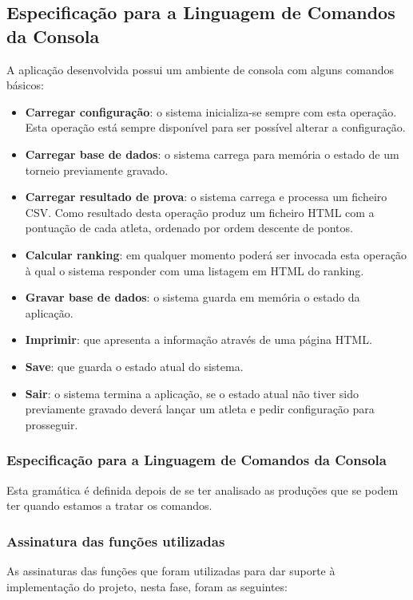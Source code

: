 \documentclass[11pt, a4paper, oneside]{article}
\begin{document}
\subsection{Especificação para a Linguagem de Comandos da Consola}
A aplicação desenvolvida possui um ambiente de consola com alguns comandos básicos:
\begin{itemize}
\item \textbf{Carregar configuração}: o sistema inicializa-se sempre com esta operação. Esta operação está sempre disponível para ser possível alterar a configuração.
\item \textbf{Carregar base de dados}: o sistema carrega para memória o estado de um torneio previamente gravado.
\item \textbf{Carregar resultado de prova}: o sistema carrega e processa um ficheiro CSV. Como resultado desta operação produz um ficheiro HTML com a pontuação de cada atleta, ordenado por ordem descente de pontos.
\item \textbf{Calcular ranking}: em qualquer momento poderá ser invocada esta operação à qual o sistema responder com uma listagem em HTML do ranking.
\item \textbf{Gravar base de dados}: o sistema guarda em memória o estado da aplicação.
\item \textbf{Imprimir}: que apresenta a informação através de uma página HTML.
\item \textbf{Save}: que guarda o estado atual do sistema.
\item \textbf{Sair}: o sistema termina a aplicação, se o estado atual não tiver sido previamente gravado deverá lançar um atleta e pedir configuração para prosseguir.
\end{itemize}
\newpage
\subsubsection{Especificação para a Linguagem de Comandos da Consola}

Esta gramática é definida depois de se ter analisado as produções que se podem ter quando estamos a tratar os comandos.

\subsubsection{Assinatura das funções utilizadas}
As assinaturas das funções que foram utilizadas para dar suporte à implementação do projeto, nesta fase, foram as seguintes:
\end{document}
